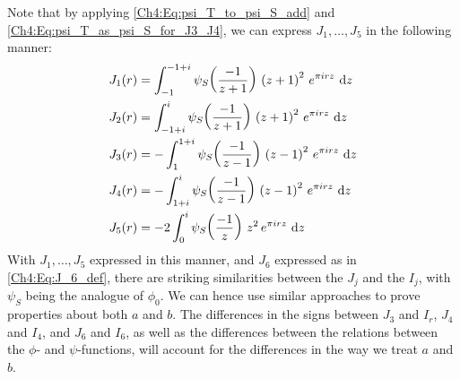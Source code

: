 Note that by applying \eqref{Ch4:Eq:psi_T_to_psi_S_add} and \eqref{Ch4:Eq:psi_T_as_psi_S_for_J3_J4}, we can express $J_1, \ldots, J_5$ in the following manner:
\begin{align}
    J_1(r) &= \int_{-1}^{-1 + i} \psi_S\of{\frac{-1}{z + 1}} \, \parenth{z + 1}^2 \, e^{\pi i r z} \, \diff{z} \label{Ch4:Eq:J1_like_I1} \\
    J_2(r) &= \int_{-1 + i}^{i} \psi_S\of{\frac{-1}{z + 1}} \, \parenth{z + 1}^2 \, e^{\pi i r z} \, \diff{z} \label{Ch4:Eq:J2_like_I2} \\
    J_3(r) &= -\int_{1}^{1 + i} \psi_S\of{\frac{-1}{z - 1}} \, \parenth{z - 1}^2 \, e^{\pi i r z} \, \diff{z} \label{Ch4:Eq:J3_like_I3} \\
    J_4(r) &= -\int_{1 + i}^{i} \psi_S\of{\frac{-1}{z - 1}} \, \parenth{z - 1}^2 \, e^{\pi i r z} \, \diff{z} \label{Ch4:Eq:J4_like_I4} \\
    J_5(r) &= -2 \int_{0}^{i} \psi_S\of{\frac{-1}{z}} \, z^2 \, e^{\pi i r z} \, \diff{z} \label{Ch4:Eq:J5_like_I5}
\end{align}
With $J_1, \ldots, J_5$ expressed in this manner, and $J_6$ expressed as in \eqref{Ch4:Eq:J_6_def}, there are striking similarities between the $J_j$ and the $I_j$, with $\psi_S$ being the analogue of $\phi_0$. We can hence use similar approaches to prove properties about both $a$ and $b$. The differences in the signs between $J_3$ and $I_r$, $J_4$ and $I_4$, and $J_6$ and $I_6$, as well as the differences between the relations between the $\phi$- and $\psi$-functions, will account for the differences in the way we treat $a$ and $b$.